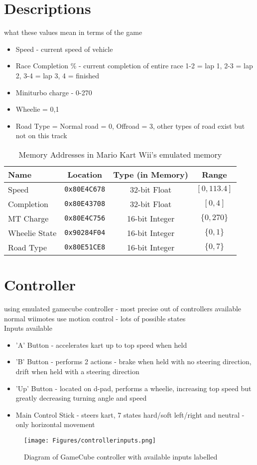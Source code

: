 \section{Descriptions}
what these values mean in terms of the game
\begin{itemize}
    \item Speed - current speed of vehicle
    \item Race Completion \% - current completion of entire race 1-2 = lap 1, 2-3 = lap 2, 3-4 = lap 3, 4 = finished
    \item Miniturbo charge - 0-270
    \item Wheelie = 0,1
    \item Road Type = Normal road = 0, Offroad = 3, other types of road exist but not on this track
\end{itemize}
\begin{table}[h]
    \centering
    \begin{tabular}{l|c|c|c}
    \textbf{Name}  & \textbf{Location} & \textbf{Type (in Memory)} & \textbf{Range}\\
    \hline
     Speed  &        \texttt{0x80E4C678} & 32-bit Float  & $$[0, 113.4]$$\\
     Completion  &   \texttt{0x80E43708} & 32-bit Float  & $$[0, 4] $$\\
     MT Charge &     \texttt{0x80E4C756} & 16-bit Integer& $$\{0,270\}$$\\
     Wheelie State & \texttt{0x90284F04} & 16-bit Integer& $$\{0,1\}$$\\
     Road Type &     \texttt{0x80E51CE8} & 16-bit Integer& $$ \{0,7\} $$\\
    \end{tabular}
    \caption{Memory Addresses in Mario Kart Wii's emulated memory}
    \label{tab:memory-addresses}
\end{table}
\section{Controller}
using emulated gamecube controller - most precise out of controllers available \\
normal wiimotes use motion control - lots of possible states\\
Inputs available
\begin{itemize}
    \item 'A' Button - accelerates kart up to top speed when held
    \item 'B' Button - performs 2 actions - brake when held with no steering direction, drift when held with a steering direction
    \item 'Up' Button - located on d-pad, performs a wheelie, increasing top speed but greatly decreasing turning angle and speed
    \item Main Control Stick - steers kart, 7 states hard/soft left/right and neutral - only horizontal movement
\end{itemize}
\begin{figure}
    \centering
    \texttt{[image: Figures/controllerinputs.png]}
    \caption{Diagram of GameCube controller with available inputs labelled}
    \label{fig:laballed-gc-diagram}
\end{figure}